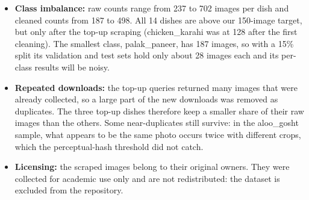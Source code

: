\begin{itemize}
  \item \textbf{Class imbalance:} raw counts range from 237 to 702 images per dish and cleaned counts from 187 to 498. All 14 dishes are above our 150-image target, but only after the top-up scraping (chicken\_karahi was at 128 after the first cleaning). The smallest class, palak\_paneer, has 187 images, so with a 15\% split its validation and test sets hold only about 28 images each and its per-class results will be noisy.
  \item \textbf{Repeated downloads:} the top-up queries returned many images that were already collected, so a large part of the new downloads was removed as duplicates. The three top-up dishes therefore keep a smaller share of their raw images than the others. Some near-duplicates still survive: in the aloo\_gosht sample, what appears to be the same photo occurs twice with different crops, which the perceptual-hash threshold did not catch.
  \item \textbf{Licensing:} the scraped images belong to their original owners. They were collected for academic use only and are not redistributed: the dataset is excluded from the repository.
\end{itemize}
